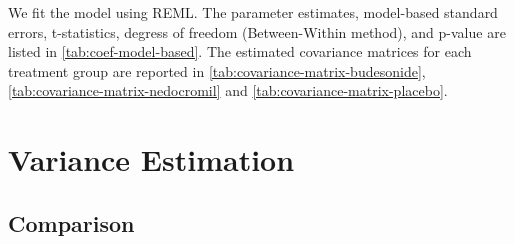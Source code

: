 \documentclass[12pt]{article}
\begin{document}
We fit the model using REML. The parameter estimates, model-based
standard errors, t-statistics, degress of freedom (Between-Within method), 
and p-value
are listed in \cref{tab:coef-model-based}.
The estimated covariance matrices for each treatment group
are reported in \cref{tab:covariance-matrix-budesonide},
\cref{tab:covariance-matrix-nedocromil} and
\cref{tab:covariance-matrix-placebo}.

\begin{table}[htbp]
  \centering
  \caption{Estimated covariance matrix under exponential correlation with unequal variance (Budesonide)}
  \label{tab:covariance-matrix-budesonide}
  \begingroup\let\small\scriptsize\makebox[\textwidth][c]{}\endgroup
\end{table}

\begin{table}[htbp]
  \centering
  \caption{Estimated covariance matrix under exponential correlation with unequal variance (Nedocromil)}
  \label{tab:covariance-matrix-nedocromil}
  \begingroup\let\small\scriptsize\makebox[\textwidth][c]{}\endgroup
\end{table}

\begin{table}[htbp]
  \centering
  \caption{Estimated covariance matrix under exponential correlation with unequal variance (Placebo)}
  \label{tab:covariance-matrix-placebo}
  \begingroup\let\small\scriptsize\makebox[\textwidth][c]{}\endgroup
\end{table}





\section{Variance Estimation }

\subsection{Comparison}

\begin{table}[htbp]
  \caption{Comparison of model-based and robust coefficient summaries}
  \label{tab:coef-model-vs-robust}
  
\end{table}
\end{document}
